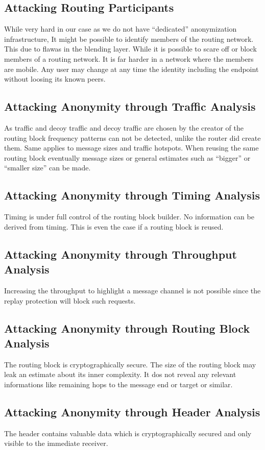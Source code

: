 \subsection{Attacking Routing Participants}
While very hard in our case as we do not have ``dedicated'' anonymization infrastructure, It might be possible to identify members of the routing network. This due to flawas in the blending layer. While it is possible to scare off or block members of a routing network. It is far harder in a network where the members are mobile. Any user may change at any time the identity including the endpoint without loosing its known peers.

\subsection{Attacking Anonymity through Traffic Analysis}
As traffic and decoy traffic and decoy traffic are chosen by the creator of the routing block frequency patterns can not be detected, unlike the router did create them. Same applies to message sizes and traffic hotspots. When reusing the same routing block eventually message sizes or general estimates such as ``bigger'' or ``smaller size'' can be made.

\subsection{Attacking Anonymity through Timing Analysis}
Timing is under full control of the routing block builder. No information can be derived from timing. This is even the case if a routing block is reused.

\subsection{Attacking Anonymity through Throughput Analysis}
Increasing the throughput to highlight a message channel is not possible since the replay protection will block such requests.

\subsection{Attacking Anonymity through Routing Block Analysis}
The routing block is cryptographically secure. The size of the routing block may leak an estimate about its inner complexity. It dos not reveal any relevant informations like remaining hops to the message end or  target or similar.

\subsection{Attacking Anonymity through Header Analysis}
The header contains valuable data which is cryptographically secured and only visible to the immediate receiver. 

